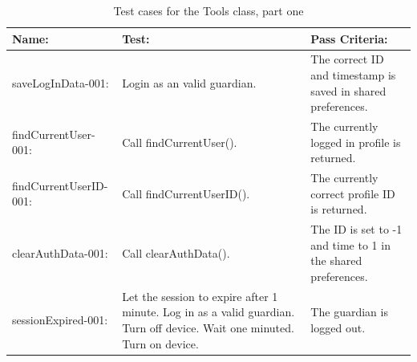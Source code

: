 \begin{table}[ht]
\caption{Test cases for the Tools class, part one} %
\centering  %
\begin{tabular}{| p{1.7in} | p{1.7in} | p{1.7in} |}
\hline
Name: & Test: & Pass Criteria: \\ [0.5ex] %
\hline    
saveLogInData-001: & Login as an valid guardian. & The correct ID and timestamp is saved in shared preferences. \\ \hline 
findCurrentUser-001: & Call findCurrentUser(). & The currently logged in profile is returned. \\ \hline
findCurrentUserID-001: & Call findCurrentUserID(). & The currently correct profile ID is returned. \\ \hline 
clearAuthData-001: & Call clearAuthData(). & The ID is set to -1 and time to 1 in the shared preferences. \\ \hline 
sessionExpired-001: & Let the session to expire after 1 minute. \newline Log in as a valid guardian. Turn off device. Wait one minuted. Turn on device. & The guardian is logged out. \\ [1ex] 
\hline %
\end{tabular}
\label{table:tools_tests1} %
\end{table}

